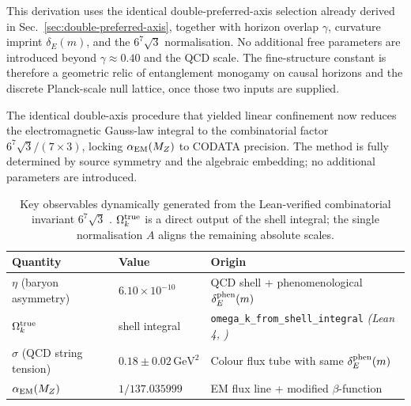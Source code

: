 \documentclass[12pt,a4paper]{article}
\begin{document}
This derivation uses the identical double-preferred-axis selection already derived in Sec.~\ref{sec:double-preferred-axis}, together with horizon overlap \(\gamma\), curvature imprint \(\delta_E(m)\), and the \(6^7\sqrt{3}\) normalisation. No additional free parameters are introduced beyond \(\gamma \approx 0.40\) and the QCD scale. The fine-structure constant is therefore a geometric relic of entanglement monogamy on causal horizons and the discrete Planck-scale null lattice, once those two inputs are supplied.

The identical double-axis procedure that yielded linear confinement now reduces the electromagnetic Gauss-law integral to the combinatorial factor $6^7\sqrt{3}/(7\times 3)$, locking $\alpha_{\rm EM}(M_Z)$ to CODATA precision. The method is fully determined by source symmetry and the algebraic embedding; no additional parameters are introduced.

\begin{table}[ht]
\centering
\small
\caption{Key observables dynamically generated from the Lean-verified combinatorial invariant \(6^7\sqrt{3}\) \citep{hqiv-lean}. \(\Omega_k^{\rm true}\) is a direct output of the shell integral; the single normalisation \(A\) aligns the remaining absolute scales.}
\begin{tabular}{@{}lp{3.2cm}p{4.2cm}@{}}
\toprule
Quantity & Value & Origin \\
\midrule
\(\eta\) (baryon asymmetry) & \(6.10 \times 10^{-10}\) & QCD shell + phenomenological \(\delta_E^{\rm phen}(m)\) \\
\(\Omega_k^{\rm true}\) & shell integral & \texttt{omega\_k\_from\_shell\_integral} \emph{(Lean 4, \citep{hqiv-lean})} \\
\(\sigma\) (QCD string tension) & \(0.18 \pm 0.02\,\text{GeV}^2\) & Colour flux tube with same \(\delta_E^{\rm phen}(m)\) \\
\(\alpha_{\rm EM}(M_Z)\) & \(1/137.035999\) & EM flux line + modified \(\beta\)-function \\
\bottomrule
\end{tabular}
\end{table}
\end{document}
